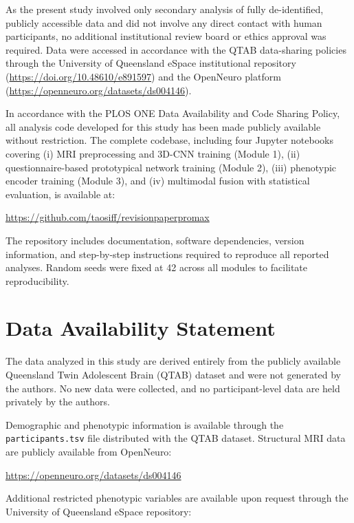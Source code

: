 \documentclass[10pt,letterpaper]{article}
\begin{document}
As the present study involved only secondary analysis of fully de-identified, publicly accessible data and did not involve any direct contact with human participants, no additional institutional review board or ethics approval was required. Data were accessed in accordance with the QTAB data-sharing policies through the University of Queensland eSpace institutional repository (\url{https://doi.org/10.48610/e891597}) and the OpenNeuro platform (\url{https://openneuro.org/datasets/ds004146}).

In accordance with the PLOS ONE Data Availability and Code Sharing Policy, all analysis code developed for this study has been made publicly available without restriction. The complete codebase, including four Jupyter notebooks covering (i) MRI preprocessing and 3D-CNN training (Module 1), (ii) questionnaire-based prototypical network training (Module 2), (iii) phenotypic encoder training (Module 3), and (iv) multimodal fusion with statistical evaluation, is available at:

\begin{center}
\url{https://github.com/taosiff/revisionpaperpromax}
\end{center}

The repository includes documentation, software dependencies, version information, and step-by-step instructions required to reproduce all reported analyses. Random seeds were fixed at 42 across all modules to facilitate reproducibility.

\section*{Data Availability Statement}

The data analyzed in this study are derived entirely from the publicly available Queensland Twin Adolescent Brain (QTAB) dataset and were not generated by the authors. No new data were collected, and no participant-level data are held privately by the authors.

Demographic and phenotypic information is available through the \texttt{participants.tsv} file distributed with the QTAB dataset. Structural MRI data are publicly available from OpenNeuro:

\begin{center}
\url{https://openneuro.org/datasets/ds004146}
\end{center}

Additional restricted phenotypic variables are available upon request through the University of Queensland eSpace repository:
\end{document}
